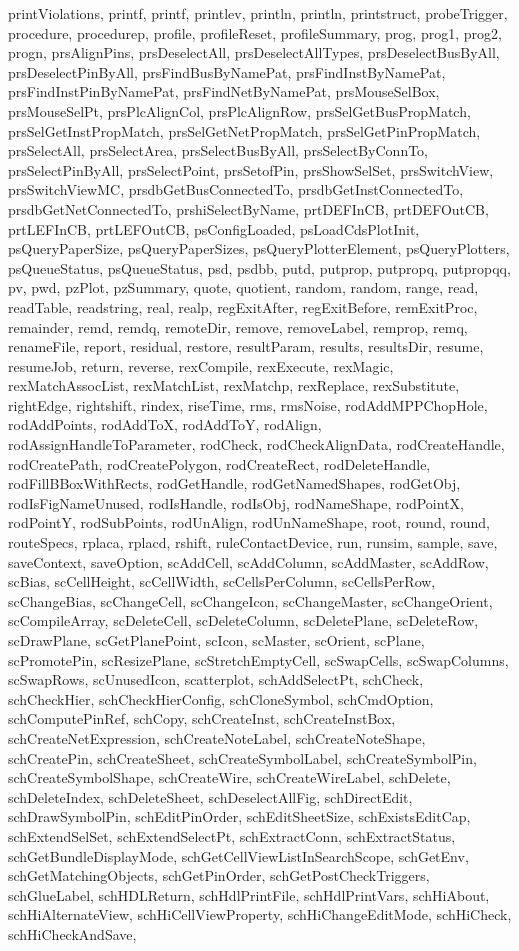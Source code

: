 {{printViolations, printf, printf, printlev, println, println, printstruct, probeTrigger, procedure, procedurep, profile, profileReset, profileSummary, prog, prog1, prog2, progn, prsAlignPins, prsDeselectAll, prsDeselectAllTypes, prsDeselectBusByAll, prsDeselectPinByAll, prsFindBusByNamePat, prsFindInstByNamePat, prsFindInstPinByNamePat, prsFindNetByNamePat, prsMouseSelBox, prsMouseSelPt, prsPlcAlignCol, prsPlcAlignRow, prsSelGetBusPropMatch, prsSelGetInstPropMatch, prsSelGetNetPropMatch, prsSelGetPinPropMatch, prsSelectAll, prsSelectArea, prsSelectBusByAll, prsSelectByConnTo, prsSelectPinByAll, prsSelectPoint, prsSetofPin, prsShowSelSet, prsSwitchView, prsSwitchViewMC, prsdbGetBusConnectedTo, prsdbGetInstConnectedTo, prsdbGetNetConnectedTo, prshiSelectByName, prtDEFInCB, prtDEFOutCB, prtLEFInCB, prtLEFOutCB, psConfigLoaded, psLoadCdsPlotInit, psQueryPaperSize, psQueryPaperSizes, psQueryPlotterElement, psQueryPlotters, psQueueStatus, psQueueStatus, psd, psdbb, putd, putprop, putpropq, putpropqq, pv, pwd, pzPlot, pzSummary, quote, quotient, random, random, range, read, readTable, readstring, real, realp, regExitAfter, regExitBefore, remExitProc, remainder, remd, remdq, remoteDir, remove, removeLabel, remprop, remq, renameFile, report, residual, restore, resultParam, results, resultsDir, resume, resumeJob, return, reverse, rexCompile, rexExecute, rexMagic, rexMatchAssocList, rexMatchList, rexMatchp, rexReplace, rexSubstitute, rightEdge, rightshift, rindex, riseTime, rms, rmsNoise, rodAddMPPChopHole, rodAddPoints, rodAddToX, rodAddToY, rodAlign, rodAssignHandleToParameter, rodCheck, rodCheckAlignData, rodCreateHandle, rodCreatePath, rodCreatePolygon, rodCreateRect, rodDeleteHandle, rodFillBBoxWithRects, rodGetHandle, rodGetNamedShapes, rodGetObj, rodIsFigNameUnused, rodIsHandle, rodIsObj, rodNameShape, rodPointX, rodPointY, rodSubPoints, rodUnAlign, rodUnNameShape, root, round, round, routeSpecs, rplaca, rplacd, rshift, ruleContactDevice, run, runsim, sample, save, saveContext, saveOption, scAddCell, scAddColumn, scAddMaster, scAddRow, scBias, scCellHeight, scCellWidth, scCellsPerColumn, scCellsPerRow, scChangeBias, scChangeCell, scChangeIcon, scChangeMaster, scChangeOrient, scCompileArray, scDeleteCell, scDeleteColumn, scDeletePlane, scDeleteRow, scDrawPlane, scGetPlanePoint, scIcon, scMaster, scOrient, scPlane, scPromotePin, scResizePlane, scStretchEmptyCell, scSwapCells, scSwapColumns, scSwapRows, scUnusedIcon, scatterplot, schAddSelectPt, schCheck, schCheckHier, schCheckHierConfig, schCloneSymbol, schCmdOption, schComputePinRef, schCopy, schCreateInst, schCreateInstBox, schCreateNetExpression, schCreateNoteLabel, schCreateNoteShape, schCreatePin, schCreateSheet, schCreateSymbolLabel, schCreateSymbolPin, schCreateSymbolShape, schCreateWire, schCreateWireLabel, schDelete, schDeleteIndex, schDeleteSheet, schDeselectAllFig, schDirectEdit, schDrawSymbolPin, schEditPinOrder, schEditSheetSize, schExistsEditCap, schExtendSelSet, schExtendSelectPt, schExtractConn, schExtractStatus, schGetBundleDisplayMode, schGetCellViewListInSearchScope, schGetEnv, schGetMatchingObjects, schGetPinOrder, schGetPostCheckTriggers, schGlueLabel, schHDLReturn, schHdlPrintFile, schHdlPrintVars, schHiAbout, schHiAlternateView, schHiCellViewProperty, schHiChangeEditMode, schHiCheck, schHiCheckAndSave, }}
